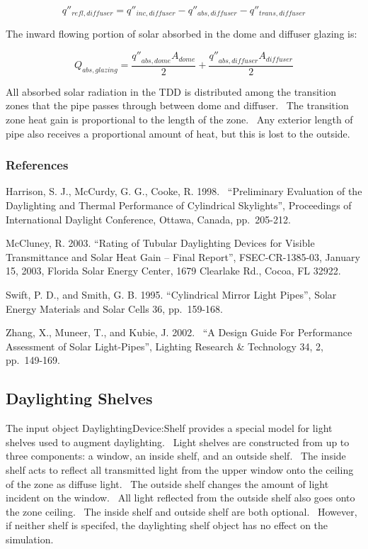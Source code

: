 \begin{equation}
{q''_{refl,diffuser}} = {q''_{inc,diffuser}} - {q''_{abs,diffuser}} - {q''_{trans,diffuser}}
\end{equation}

The inward flowing portion of solar absorbed in the dome and diffuser glazing is:

\begin{equation}
{Q_{abs,glazing}} = \frac{{{{q''}_{abs,dome}}{A_{dome}}}}{2} + \frac{{{{q''}_{abs,diffuser}}{A_{diffuser}}}}{2}
\end{equation}

All absorbed solar radiation in the TDD is distributed among the transition zones that the pipe passes through between dome and diffuser.~ The transition zone heat gain is proportional to the length of the zone.~ Any exterior length of pipe also receives a proportional amount of heat, but this is lost to the outside.

\subsubsection{References}\label{references-016}

Harrison, S. J., McCurdy, G. G., Cooke, R. 1998.~ ``Preliminary Evaluation of the Daylighting and Thermal Performance of Cylindrical Skylights'', Proceedings of International Daylight Conference, Ottawa, Canada, pp.~205-212.

McCluney, R. 2003. ``Rating of Tubular Daylighting Devices for Visible Transmittance and Solar Heat Gain -- Final Report'', FSEC-CR-1385-03, January 15, 2003, Florida Solar Energy Center, 1679 Clearlake Rd., Cocoa, FL 32922.

Swift, P. D., and Smith, G. B. 1995. ``Cylindrical Mirror Light Pipes'', Solar Energy Materials and Solar Cells 36, pp.~159-168.

Zhang, X., Muneer, T., and Kubie, J. 2002.~ ``A Design Guide For Performance Assessment of Solar Light-Pipes'', Lighting Research \& Technology 34, 2, pp.~149-169.

\subsection{Daylighting Shelves}\label{daylighting-shelves}

The input object DaylightingDevice:Shelf provides a special model for light shelves used to augment daylighting.~ Light shelves are constructed from up to three components: a window, an inside shelf, and an outside shelf.~ The inside shelf acts to reflect all transmitted light from the upper window onto the ceiling of the zone as diffuse light.~ The outside shelf changes the amount of light incident on the window.~ All light reflected from the outside shelf also goes onto the zone ceiling.~ The inside shelf and outside shelf are both optional.~ However, if neither shelf is specifed, the daylighting shelf object has no effect on the simulation.

